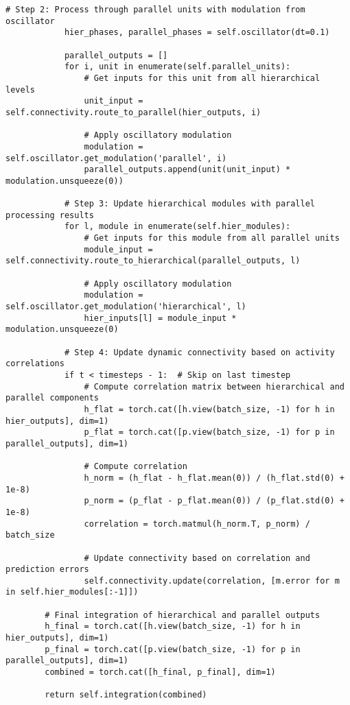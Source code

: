 \documentclass[11pt,a4paper,twocolumn]{article}
\begin{document}
\begin{lstlisting}[caption={Complete HSPMN PyTorch Implementation}, label={lst:hspmn-pytorch}]
            # Step 2: Process through parallel units with modulation from oscillator
            hier_phases, parallel_phases = self.oscillator(dt=0.1)

            parallel_outputs = []
            for i, unit in enumerate(self.parallel_units):
                # Get inputs for this unit from all hierarchical levels
                unit_input = self.connectivity.route_to_parallel(hier_outputs, i)

                # Apply oscillatory modulation
                modulation = self.oscillator.get_modulation('parallel', i)
                parallel_outputs.append(unit(unit_input) * modulation.unsqueeze(0))

            # Step 3: Update hierarchical modules with parallel processing results
            for l, module in enumerate(self.hier_modules):
                # Get inputs for this module from all parallel units
                module_input = self.connectivity.route_to_hierarchical(parallel_outputs, l)

                # Apply oscillatory modulation
                modulation = self.oscillator.get_modulation('hierarchical', l)
                hier_inputs[l] = module_input * modulation.unsqueeze(0)

            # Step 4: Update dynamic connectivity based on activity correlations
            if t < timesteps - 1:  # Skip on last timestep
                # Compute correlation matrix between hierarchical and parallel components
                h_flat = torch.cat([h.view(batch_size, -1) for h in hier_outputs], dim=1)
                p_flat = torch.cat([p.view(batch_size, -1) for p in parallel_outputs], dim=1)

                # Compute correlation
                h_norm = (h_flat - h_flat.mean(0)) / (h_flat.std(0) + 1e-8)
                p_norm = (p_flat - p_flat.mean(0)) / (p_flat.std(0) + 1e-8)
                correlation = torch.matmul(h_norm.T, p_norm) / batch_size

                # Update connectivity based on correlation and prediction errors
                self.connectivity.update(correlation, [m.error for m in self.hier_modules[:-1]])

        # Final integration of hierarchical and parallel outputs
        h_final = torch.cat([h.view(batch_size, -1) for h in hier_outputs], dim=1)
        p_final = torch.cat([p.view(batch_size, -1) for p in parallel_outputs], dim=1)
        combined = torch.cat([h_final, p_final], dim=1)

        return self.integration(combined)
\end{lstlisting}
\twocolumn
\end{document}
